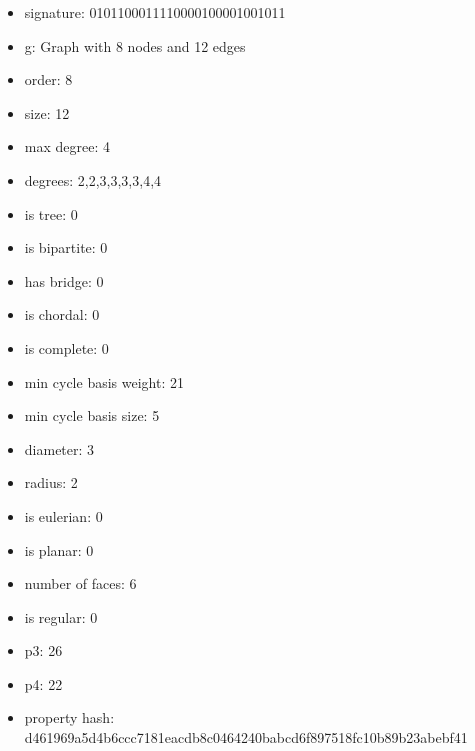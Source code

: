 \begin{itemize}
\item signature: 0101100011110000100001001011
\item g: Graph with 8 nodes and 12 edges
\item order: 8
\item size: 12
\item max degree: 4
\item degrees: 2,2,3,3,3,3,4,4
\item is tree: 0
\item is bipartite: 0
\item has bridge: 0
\item is chordal: 0
\item is complete: 0
\item min cycle basis weight: 21
\item min cycle basis size: 5
\item diameter: 3
\item radius: 2
\item is eulerian: 0
\item is planar: 0
\item number of faces: 6
\item is regular: 0
\item p3: 26
\item p4: 22
\item property hash: d461969a5d4b6ccc7181eacdb8c0464240babcd6f897518fc10b89b23abebf41
\end{itemize}
\newpage
\begin{figure}
\end{figure}

